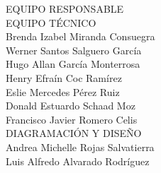 {\Bold \LARGE EQUIPO RESPONSABLE}\\[2cm]
{\Bold \large \color{color1!89!black} EQUIPO TÉCNICO}\\[0.2cm]
Brenda Izabel Miranda Consuegra\\
Werner Santos Salguero García\\
Hugo Allan García Monterrosa\\
Henry Efraín Coc Ramírez\\
Eslie Mercedes Pérez Ruiz \\
Donald Estuardo Schaad Moz\\
Francisco Javier Romero Celis\\[0.8cm]
{\Bold \large \color{color1!89!black} DIAGRAMACIÓN Y DISEÑO}\\[0.2cm]
Andrea Michelle Rojas Salvatierra \\
Luis Alfredo Alvarado Rodríguez

